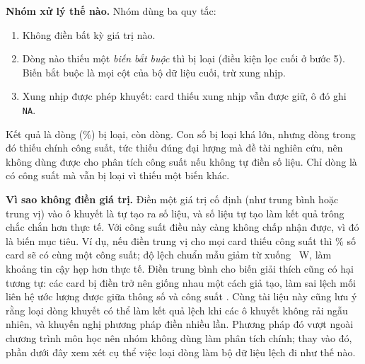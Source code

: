 \textbf{Nhóm xử lý thế nào.} Nhóm dùng ba quy tắc:
\begin{enumerate}
  \item Không điền bất kỳ giá trị nào.
  \item Dòng nào thiếu một \emph{biến bắt buộc} thì bị loại (điều kiện lọc cuối ở bước 5).
    Biến bắt buộc là mọi cột của bộ dữ liệu cuối, trừ xung nhịp.
  \item Xung nhịp được phép khuyết: card thiếu xung nhịp vẫn được giữ, ô đó ghi
    \texttt{NA}.
\end{enumerate}
Kết quả là \PreRowsIncomplete{} dòng (\PreRowsIncompletePct\%) bị loại, còn \PreRowsFinal{}
dòng. Con số bị loại khá lớn, nhưng \PrePowerMissing{} dòng trong đó thiếu chính
công suất, tức thiếu đúng đại lượng mà đề tài nghiên cứu, nên không dùng được cho phân tích
công suất nếu không tự điền số liệu. Chỉ \PrePowerRowsLostByDropAll{} dòng là có công suất mà vẫn bị loại vì thiếu
một biến khác.

\textbf{Vì sao không điền giá trị.} Điền một giá trị cố định (như trung bình hoặc trung
vị) vào ô khuyết là tự tạo ra số liệu, và số liệu tự tạo làm kết quả trông chắc chắn hơn
thực tế. Với công suất điều này càng
không chấp nhận được, vì đó là biến mục tiêu. Ví dụ, nếu điền trung vị cho mọi card thiếu
công suất thì \PrePowerAtMedianImputed\% số card sẽ có cùng một công suất; độ lệch chuẩn
mẫu giảm từ \PrePowerSdDropped{} xuống \PrePowerSdImputed~W, làm khoảng tin cậy hẹp hơn
thực tế. Điền trung bình cho biến giải thích cũng có hại tương tự: các card bị điền trở
nên giống nhau một cách giả tạo, làm sai lệch mối liên hệ ước lượng được giữa thông số và
công suất \cite{donders2006}. Cùng tài liệu này cũng lưu ý rằng loại dòng khuyết có thể
làm kết quả lệch khi các ô khuyết không rải ngẫu nhiên, và khuyến nghị phương pháp điền
nhiều lần. Phương pháp đó vượt ngoài chương trình môn học nên nhóm không dùng làm phân tích
chính; thay vào đó, phần dưới đây xem xét cụ thể việc loại dòng làm bộ dữ liệu lệch đi như
thế nào.

